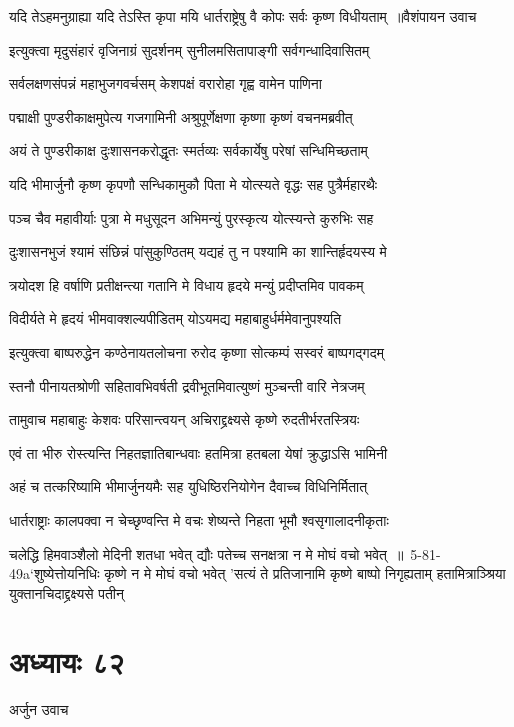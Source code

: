 \threelineshloka
{यदि तेऽहमनुग्राह्या यदि तेऽस्ति कृपा मयि}
{धार्तराष्ट्रेषु वै कोपः सर्वः कृष्ण विधीयताम् ॥वैशंपायन उवाच}
{}


\twolineshloka
{इत्युक्त्वा मृदुसंहारं वृजिनाग्रं सुदर्शनम्}
{सुनीलमसितापाङ्गी सर्वगन्धादिवासितम्}


\twolineshloka
{सर्वलक्षणसंपन्नं महाभुजगवर्चसम्}
{केशपक्षं वरारोहा गृह्व वामेन पाणिना}


\twolineshloka
{पद्माक्षी पुण्डरीकाक्षमुपेत्य गजगामिनी}
{अश्रुपूर्णेक्षणा कृष्णा कृष्णं वचनमब्रवीत्}


\twolineshloka
{अयं ते पुण्डरीकाक्ष दुःशासनकरोद्धृतः}
{स्मर्तव्यः सर्वकार्येषु परेषां सन्धिमिच्छताम्}


\twolineshloka
{यदि भीमार्जुनौ कृष्ण कृपणौ सन्धिकामुकौ}
{पिता मे योत्स्यते वृद्धः सह पुत्रैर्महारथैः}


\twolineshloka
{पञ्च चैव महावीर्याः पुत्रा मे मधुसूदन}
{अभिमन्युं पुरस्कृत्य योत्स्यन्ते कुरुभिः सह}


\twolineshloka
{दुःशासनभुजं श्यामं संछिन्नं पांसुकुण्ठितम्}
{यद्यहं तु न पश्यामि का शान्तिर्हृदयस्य मे}


\twolineshloka
{त्रयोदश हि वर्षाणि प्रतीक्षन्त्या गतानि मे}
{विधाय हृदये मन्युं प्रदीप्तमिव पावकम्}


\twolineshloka
{विदीर्यते मे हृदयं भीमवाक्शल्यपीडितम्}
{योऽयमद्य महाबाहुर्धर्ममेवानुपश्यति}


\twolineshloka
{इत्युक्त्वा बाष्परुद्धेन कण्ठेनायतलोचना}
{रुरोद कृष्णा सोत्कम्पं सस्वरं बाष्पगद्गदम्}


\twolineshloka
{स्तनौ पीनायतश्रोणी सहितावभिवर्षती}
{द्रवीभूतमिवात्युष्णं मुञ्चन्ती वारि नेत्रजम्}


\twolineshloka
{तामुवाच महाबाहुः केशवः परिसान्त्वयन्}
{अचिराद्द्रक्ष्यसे कृष्णे रुदतीर्भरतस्त्रियः}


\twolineshloka
{एवं ता भीरु रोस्त्यन्ति निहतज्ञातिबान्धवाः}
{हतमित्रा हतबला येषां क्रुद्धाऽसि भामिनी}


\twolineshloka
{अहं च तत्करिष्यामि भीमार्जुनयमैः सह}
{युधिष्ठिरनियोगेन दैवाच्च विधिनिर्मितात्}


\twolineshloka
{धार्तराष्ट्राः कालपक्वा न चेच्छृण्वन्ति मे वचः}
{शेष्यन्ते निहता भूमौ श्वसृगालादनीकृताः}


\fourlineindentedshloka
{चलेद्धि हिमवाञ्शैलो मेदिनी शतधा भवेत्}
{द्यौः पतेच्च सनक्षत्रा न मे मोघं वचो भवेत् ॥ 5-81-49a`शुष्येत्तोयनिधिः कृष्णे न मे मोघं वचो भवेत्}
{'सत्यं ते प्रतिजानामि कृष्णे बाष्पो निगृह्यताम्}
{हतामित्राञ्श्रिया युक्तानचिदाद्द्रक्ष्यसे पतीन्}


\chapter{अध्यायः ८२}
\twolineshloka
{अर्जुन उवाच}
{}


